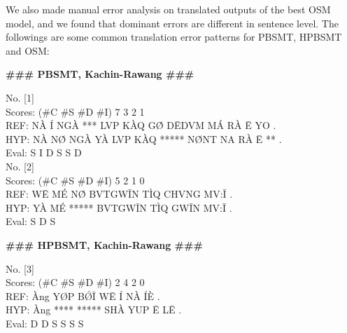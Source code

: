 \documentclass[conference]{IEEEtran}
\begin{document}
We also made manual error analysis on translated outputs of the best OSM model, and we found that dominant errors are different in sentence level. The followings are some common translation error patterns for PBSMT, HPBSMT and OSM: \\


\begin{center} \textbf{\#\#\# PBSMT, Kachin-Rawang \#\#\#}  \\ \end{center}
\noindent No. [1]\\
\noindent Scores: (\#C \#S \#D \#I) 7 3 2 1\\
REF:  NÀ Í    NGÀ *** LVP KÀQ GØ̀ DĒDVM  MÁ RÀ Ē YO . \\
HYP:  NÀ NØ̀ NGÀ YÀ LVP KÀQ ***** NØ̀NT NA   RÀ Ē ** . \\
Eval:     S          I            D     S       S          D   \\

\noindent No. [2]\\
\noindent Scores: (\#C \#S \#D \#I) 5 2 1 0\\
REF:  WĒ MÉ NØ̀ BVTGWĪN TÌQ CHVNG MV:Ī . \\
HYP:  YÀ MÉ ***** BVTGWĪN TÌQ GWĪN MV:Ī . \\
Eval: S       D                   S  \\

\begin{center} \textbf{\#\#\# HPBSMT, Kachin-Rawang \#\#\#}  \\ \end{center}
\noindent No. [3]\\
\noindent Scores: (\#C \#S \#D \#I) 2 4 2 0\\
REF:  Àng YØP BǾĪ WĒ  Í  NÀ ÍÈ .\\ 
HYP:  Àng **** ***** SHÀ YUP Ē  LĒ  .\\ 
Eval:      D    D     S    S   S   S \\
\end{document}
